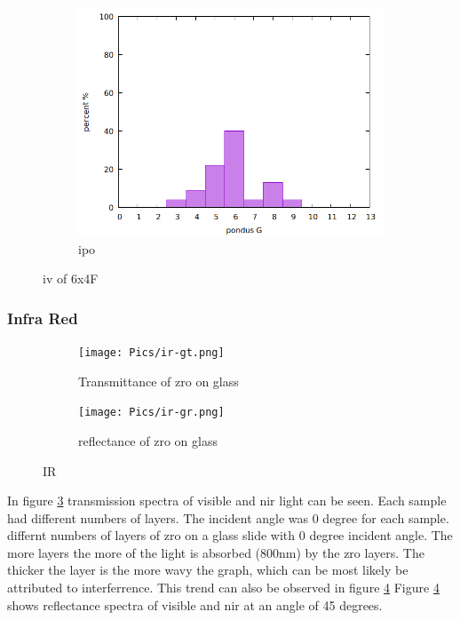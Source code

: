 \begin{figure}
\begin{subfigure}{.3\textwidth}
    \end{subfigure}
    \begin{subfigure}{.3\textwidth}
        \includegraphics[width=\textwidth]{Pics/iv/iv-192-ipo.png}
        \caption{ipo} \label{fig:ipo}
    \end{subfigure}
    \caption{iv of 6x4F} \label{fig:iv-ipo}
\end{figure}

\subsubsection{Infra Red}

\begin{figure}
    \centering
    \begin{subfigure}{.49\textwidth}
        \centering
        \texttt{[image: Pics/ir-gt.png]}
        \caption{Transmittance of \gls{zro} on glass} \label{fig:ir-gt}
    \end{subfigure}
    \begin{subfigure}{.49\textwidth}
        \centering
        \texttt{[image: Pics/ir-gr.png]}
        \caption{reflectance of \gls{zro} on glass} \label{fig:ir-gr}
    \end{subfigure}
    \caption{IR} \label{fig:ir}
\end{figure}

In figure \ref{fig:ir-gt} transmission spectra of visible and \gls{nir} light can be seen. 
Each sample had different numbers of layers. 
The incident angle was 0 degree for each sample.
differnt numbers of layers of \gls{zro} on a glass slide with 0 degree incident angle. 
The more layers the more of the light is absorbed (800nm) by the \gls{zro} layers. 
The thicker the layer is the more wavy the graph, which can be most likely be attributed to interferrence. 
This trend can also be observed in figure \ref{fig:ir-gr}
Figure \ref{fig:ir-gr} shows reflectance spectra of visible and \gls{nir} at an angle of 45 degrees. 


